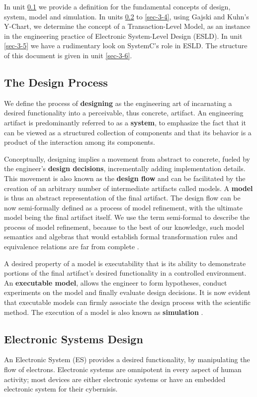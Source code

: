 \documentclass[12pt,twoside]{article}
\begin{document}
In unit \ref{sec-3-1} we provide a definition for the fundamental concepts of design, system, model and simulation.
In units \ref{sec-3-2} to \ref{sec-3-4}, using Gajski and Kuhn's Y-Chart, we determine the concept of a Transaction-Level Model, as an instance in the engineering practice of Electronic System-Level Design (ESLD).
In unit \ref{sec-3-5} we have a rudimentary look on SystemC's role in ESLD.
The structure of this document is given in unit \ref{sec-3-6}.

\subsection{The Design Process}
\label{sec-3-1}
We define the process of \textbf{designing} as the engineering art of incarnating a desired functionality into a perceivable, thus concrete, artifact.
An engineering artifact is predominantly referred to as a \textbf{system}, 
to emphasize the fact that it can be viewed as a structured collection of components and that its behavior is a product of the interaction among its components.

Conceptually, designing implies a movement from abstract to concrete, fueled by the engineer's \textbf{design decisions}, incrementally adding implementation details.
This movement is also known as the \textbf{design flow} and can be facilitated by the creation of an arbitrary number of intermediate artifacts called models.
A \textbf{model} is thus an abstract representation of the final artifact. 
The design flow can be now semi-formally defined as a process of model refinement, with the ultimate model being the final artifact itself.
We use the term semi-formal to describe the process of model refinement, because to the best of our knowledge, 
such model semantics and algebras that would establish formal transformation rules and equivalence relations are far from complete \cite{Gajski2009}.

A desired property of a model is executability that is its ability to demonstrate portions of the final artifact's desired functionality in a controlled environment.
An \textbf{executable model}, allows the engineer to form hypotheses, conduct experiments on the model and finally evaluate design decisions.
It is now evident that executable models can firmly associate the design process with the scientific method.
The execution of a model is also known as \textbf{simulation} \cite{Editor2014}.


\subsection{Electronic Systems Design}
\label{sec-3-2}
An Electronic System (ES) provides a desired functionality, by manipulating the flow of electrons.
Electronic systems are omnipotent in every aspect of human activity; 
most devices are either electronic systems or have an embedded electronic system for their cybernisis.
\end{document}
